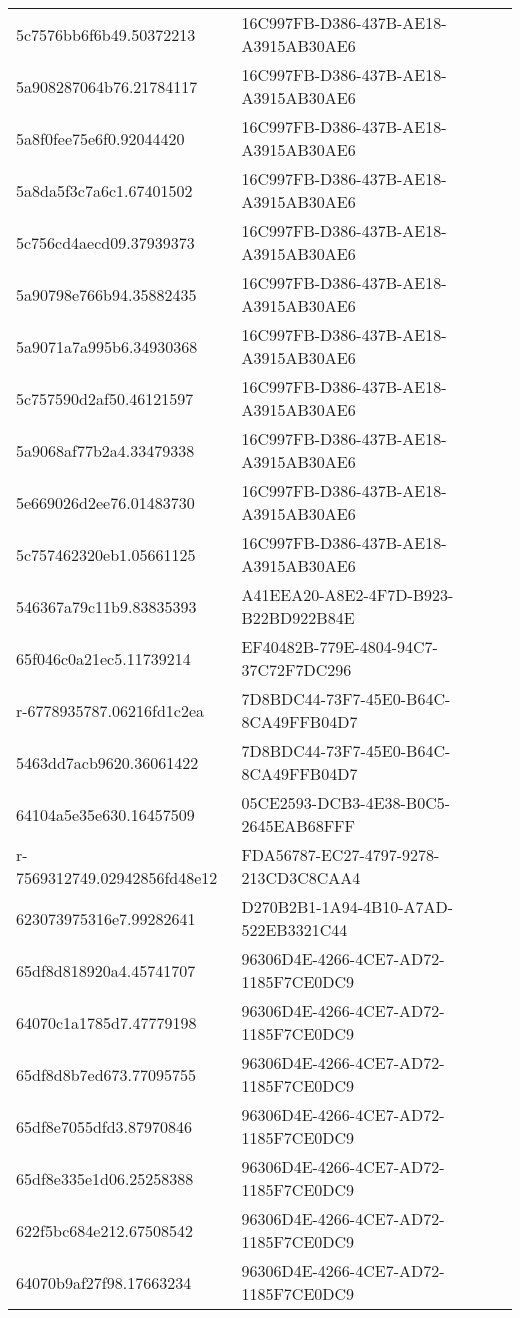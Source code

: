 \begin{tabular}{ll}
5c7576bb6f6b49.50372213 & 16C997FB-D386-437B-AE18-A3915AB30AE6 \\
5a908287064b76.21784117 & 16C997FB-D386-437B-AE18-A3915AB30AE6 \\
5a8f0fee75e6f0.92044420 & 16C997FB-D386-437B-AE18-A3915AB30AE6 \\
5a8da5f3c7a6c1.67401502 & 16C997FB-D386-437B-AE18-A3915AB30AE6 \\
5c756cd4aecd09.37939373 & 16C997FB-D386-437B-AE18-A3915AB30AE6 \\
5a90798e766b94.35882435 & 16C997FB-D386-437B-AE18-A3915AB30AE6 \\
5a9071a7a995b6.34930368 & 16C997FB-D386-437B-AE18-A3915AB30AE6 \\
5c757590d2af50.46121597 & 16C997FB-D386-437B-AE18-A3915AB30AE6 \\
5a9068af77b2a4.33479338 & 16C997FB-D386-437B-AE18-A3915AB30AE6 \\
5e669026d2ee76.01483730 & 16C997FB-D386-437B-AE18-A3915AB30AE6 \\
5c757462320eb1.05661125 & 16C997FB-D386-437B-AE18-A3915AB30AE6 \\
546367a79c11b9.83835393 & A41EEA20-A8E2-4F7D-B923-B22BD922B84E \\
65f046c0a21ec5.11739214 & EF40482B-779E-4804-94C7-37C72F7DC296 \\
r-6778935787.06216fd1c2ea & 7D8BDC44-73F7-45E0-B64C-8CA49FFB04D7 \\
5463dd7acb9620.36061422 & 7D8BDC44-73F7-45E0-B64C-8CA49FFB04D7 \\
64104a5e35e630.16457509 & 05CE2593-DCB3-4E38-B0C5-2645EAB68FFF \\
r-7569312749.02942856fd48e12 & FDA56787-EC27-4797-9278-213CD3C8CAA4 \\
623073975316e7.99282641 & D270B2B1-1A94-4B10-A7AD-522EB3321C44 \\
65df8d818920a4.45741707 & 96306D4E-4266-4CE7-AD72-1185F7CE0DC9 \\
64070c1a1785d7.47779198 & 96306D4E-4266-4CE7-AD72-1185F7CE0DC9 \\
65df8d8b7ed673.77095755 & 96306D4E-4266-4CE7-AD72-1185F7CE0DC9 \\
65df8e7055dfd3.87970846 & 96306D4E-4266-4CE7-AD72-1185F7CE0DC9 \\
65df8e335e1d06.25258388 & 96306D4E-4266-4CE7-AD72-1185F7CE0DC9 \\
622f5bc684e212.67508542 & 96306D4E-4266-4CE7-AD72-1185F7CE0DC9 \\
64070b9af27f98.17663234 & 96306D4E-4266-4CE7-AD72-1185F7CE0DC9 \\

\end{tabular}
